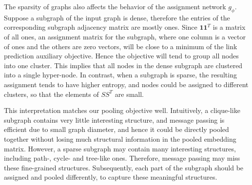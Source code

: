 {
The sparsity of graphs also affects the behavior of the assignment network $g_\phi$.
Suppose a subgraph of the input graph is dense, therefore the entries of the corresponding subgraph adjacency matrix are mostly ones. Since  $\mathbf{1} \mathbf{1}^T$ is a matrix of all ones, an assignment matrix for the subgraph, where one column is a vector of ones and the others are zero vectors, will be close to a minimum of the link prediction auxiliary objective. Hence the objective will tend to group all nodes into one cluster. This  implies that all nodes in the dense subgraph are clustered into a single hyper-node. In contrast, when a subgraph is sparse, the resulting assignment tends to have higher entropy, and nodes could be assigned to different clusters, so that the elements of $S S^T$ are small.

This interpretation matches our pooling objective well. Intuitively, a clique-like subgraph contains very little interesting structure, and message passing is efficient due to small graph diameter, and hence it could be directly pooled together without losing much structural information in the pooled embedding matrix. However, a sparse subgraph may contain many interesting structures, including path-, cycle- and tree-like ones. Therefore, message passing may miss these fine-grained structures. Subsequently, each part of the subgraph should be assigned and pooled differently, to capture these meaningful structures. 

}
